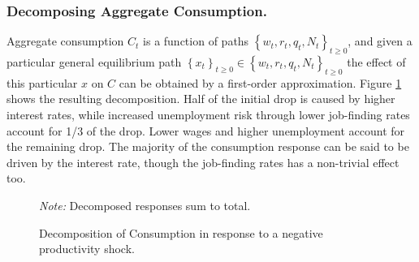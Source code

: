 \subsubsection{Decomposing Aggregate Consumption.}
Aggregate consumption $C_{t}$ is a function of paths $\left\{w_{t},r_{t},q_{t},N_{t}\right\} _{t\geq0}$, and given a particular general equilibrium path $\left\{ x_{t}\right\} _{t\geq0}\in\left\{w_{t},r_{t},q_{t},N_{t}\right\} _{t\geq0}$ the effect of this particular $x$ on $C$ can be obtained by a first-order approximation. Figure \ref{fig:baseline_C_decomp} shows the resulting decomposition. Half of the initial drop is caused by higher interest rates, while increased unemployment risk through lower job-finding rates account for 1/3 of the drop. Lower wages and higher unemployment account for the remaining drop. The majority of the consumption response can be said to be driven by the interest rate, though the job-finding rates has a non-trivial effect too. 

\begin{figure}[H]
\caption[Caption for LOF]{Decomposition of Consumption in response to a negative productivity shock. }
\label{fig:baseline_C_decomp}
\centering
\scriptsize
\centering
\emph{Note:} Decomposed responses sum to total.
\end{figure}



